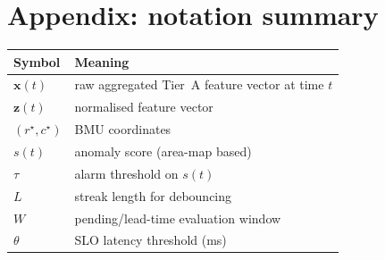 \documentclass[sigconf]{acmart}
\begin{document}
\section*{Appendix: notation summary}
\begin{tabular}{@{}ll@{}}
\toprule
Symbol & Meaning \\
\midrule
$\mathbf{x}(t)$ & raw aggregated Tier~A feature vector at time $t$ \\
$\mathbf{z}(t)$ & normalised feature vector \\
$(r^\star,c^\star)$ & BMU coordinates \\
$s(t)$ & anomaly score (area-map based) \\
$\tau$ & alarm threshold on $s(t)$ \\
$L$ & streak length for debouncing \\
$W$ & pending/lead-time evaluation window \\
$\theta$ & SLO latency threshold (ms) \\
\bottomrule
\end{tabular}








\end{document}
